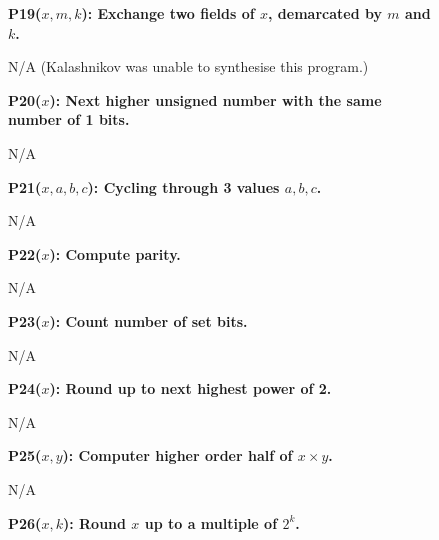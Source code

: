 \documentclass[a4paper]{llncs}
\begin{document}
\begin{figure}
\begin{multicols}{4}
   
   \begin{minipage}{.2\textwidth}
   {\bf P19($x, m, k$): Exchange two fields of $x$, demarcated by $m$ and $k$.}

   N/A ({\sc Kalashnikov} was unable to synthesise this program.)
   \end{minipage}
   \vspace{12pt}
   
   \begin{minipage}{.2\textwidth}
   {\bf P20($x$): Next higher unsigned number with the same number of 1 bits.}

   N/A
   \end{minipage}
   \vspace{12pt}
   
   \begin{minipage}{.2\textwidth}
   {\bf P21($x, a, b, c$): Cycling through 3 values $a, b, c$.}

    N/A
   \end{minipage}
   \vspace{12pt}
   
   \begin{minipage}{.2\textwidth}
   {\bf P22($x$): Compute parity.}

    N/A
   \end{minipage}
   \vspace{12pt}
   
   \begin{minipage}{.2\textwidth}
   {\bf P23($x$): Count number of set bits.}

    N/A
   \end{minipage}
      \vspace{12pt}
   
   \begin{minipage}{.2\textwidth}
   {\bf P24($x$): Round up to next highest power of 2.}

    N/A
   \end{minipage}
   \vspace{12pt}
   
   \begin{minipage}{.2\textwidth}
   {\bf P25($x, y$): Computer higher order half of $x \times y$.}

    N/A
   \end{minipage}

   \vspace{12pt}

   \begin{minipage}{.2\textwidth}
   {\bf P26($x, k$): Round $x$ up to a multiple of $2^k$.}


\end{minipage}
\end{multicols}
\end{figure}
\end{document}
